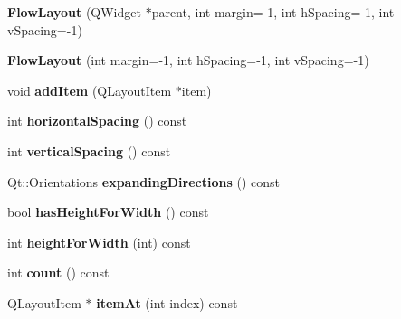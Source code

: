 \begin{DoxyCompactItemize}
\item 
\hypertarget{classFlowLayout_afd3623cad3b02592123eb8a4dd01546f}{{\bfseries Flow\+Layout} (Q\+Widget $\ast$parent, int margin=-\/1, int h\+Spacing=-\/1, int v\+Spacing=-\/1)}\label{classFlowLayout_afd3623cad3b02592123eb8a4dd01546f}

\item 
\hypertarget{classFlowLayout_a76357c75560d6bcbee7a4782c852ca07}{{\bfseries Flow\+Layout} (int margin=-\/1, int h\+Spacing=-\/1, int v\+Spacing=-\/1)}\label{classFlowLayout_a76357c75560d6bcbee7a4782c852ca07}

\item 
\hypertarget{classFlowLayout_a6a3f498fdac0145fe38838f31a6336cf}{void {\bfseries add\+Item} (Q\+Layout\+Item $\ast$item)}\label{classFlowLayout_a6a3f498fdac0145fe38838f31a6336cf}

\item 
\hypertarget{classFlowLayout_a214d375a68a3590bf4b947e02eae09a3}{int {\bfseries horizontal\+Spacing} () const }\label{classFlowLayout_a214d375a68a3590bf4b947e02eae09a3}

\item 
\hypertarget{classFlowLayout_a1b15dce81c6bce51290d3b55c35dcd3e}{int {\bfseries vertical\+Spacing} () const }\label{classFlowLayout_a1b15dce81c6bce51290d3b55c35dcd3e}

\item 
\hypertarget{classFlowLayout_a2d2b5413e1e4eff15d23134208812a47}{Qt\+::\+Orientations {\bfseries expanding\+Directions} () const }\label{classFlowLayout_a2d2b5413e1e4eff15d23134208812a47}

\item 
\hypertarget{classFlowLayout_a52203cd7f45648d9aee605b38daf4d87}{bool {\bfseries has\+Height\+For\+Width} () const }\label{classFlowLayout_a52203cd7f45648d9aee605b38daf4d87}

\item 
\hypertarget{classFlowLayout_af976e908e7bd74bd2ceff220739712a9}{int {\bfseries height\+For\+Width} (int) const }\label{classFlowLayout_af976e908e7bd74bd2ceff220739712a9}

\item 
\hypertarget{classFlowLayout_ae0d78c1e30b0bf5346e3ab94b80edeff}{int {\bfseries count} () const }\label{classFlowLayout_ae0d78c1e30b0bf5346e3ab94b80edeff}

\item 
\hypertarget{classFlowLayout_a02d52a0e8ae5cf8672b2bb1537b896f2}{Q\+Layout\+Item $\ast$ {\bfseries item\+At} (int index) const }\label{classFlowLayout_a02d52a0e8ae5cf8672b2bb1537b896f2}


\end{DoxyCompactItemize}
